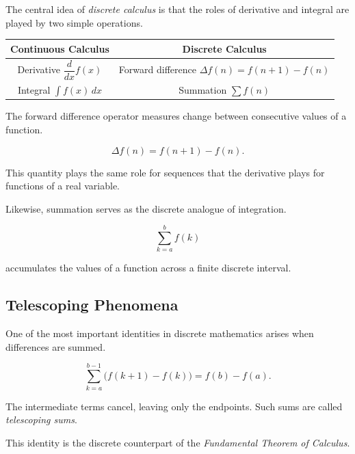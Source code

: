 \begin{exposition}
The central idea of \emph{discrete calculus} is that the roles of derivative and
integral are played by two simple operations.

\begin{tcolorbox}[colback=gray!6, colframe=gray!40, arc=2pt,
  left=6pt, right=6pt, top=4pt, bottom=4pt,
  title={\small\textbf{Continuous vs.\ Discrete Calculus}},
  fonttitle=\small\bfseries]
\renewcommand{\arraystretch}{1.4}
\begin{tabular}{@{}c|c@{}}
\textbf{Continuous Calculus} & \textbf{Discrete Calculus} \\
\hline
Derivative \( \dfrac{d}{dx} f(x) \) & Forward difference \( \Delta f(n) = f(n+1)-f(n) \) \\[6pt]
Integral \( \displaystyle\int f(x)\,dx \) & Summation \( \displaystyle\sum f(n) \)
\end{tabular}
\end{tcolorbox}

The forward difference operator measures change between consecutive values of a
function.

\[
\Delta f(n) = f(n+1) - f(n).
\]

This quantity plays the same role for sequences that the derivative plays for
functions of a real variable.

Likewise, summation serves as the discrete analogue of integration.

\[
\sum_{k=a}^{b} f(k)
\]

accumulates the values of a function across a finite discrete interval.
\end{exposition}

\subsection*{Telescoping Phenomena}

\begin{exposition}
One of the most important identities in discrete mathematics arises when
differences are summed.

\[
\sum_{k=a}^{b-1} \bigl(f(k+1)-f(k)\bigr)
=
f(b)-f(a).
\]

The intermediate terms cancel, leaving only the endpoints. Such sums are called
\emph{telescoping sums}.

This identity is the discrete counterpart of the
\emph{Fundamental Theorem of Calculus}.
\end{exposition}

